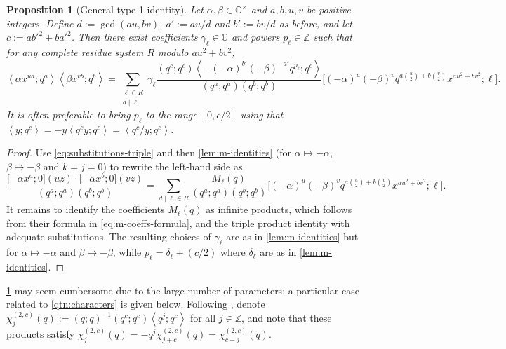 \documentclass[reqno,11pt]{amsart}
\newtheorem{proposition}[theorem]{Proposition}
\theoremstyle{definition}
\theoremstyle{remark}
\numberwithin{equation}{section}
\newcommand{\Z}{\mathbb{Z}}
\newcommand{\C}{\mathbb{C}}
\newcommand{\la}{\left\langle}
\newcommand{\ra}{\right\rangle}
\newcommand{\vect}[2]{\big[{#1};{#2}\big]}
\begin{document}
\begin{proposition}[General type-1 identity] \label{prop:general-type-1}
Let $\alpha, \beta \in \C^\times$ and $a, b, u, v$ be positive integers. Define $d := \gcd(au, bv)$, $a' := au/d$ and $b' := bv/d$ as before, and let $c := ab'^2 + ba'^2$. Then there exist coefficients $\gamma_\ell \in \C$ and powers $p_\ell \in \Z$ such that for any complete residue system $R$ modulo $au^2 + bv^2$,
\[
    \la \alpha x^{u a}; q^a \ra \la \beta x^{v b}; q^b \ra
    =
    \sum_{\substack{\ell \in R \\ d \mid \ell}} 
    \gamma_\ell \frac{(q^c; q^c)\la -(-\alpha)^{b'}(-\beta)^{-a'}q^{p_\ell} ; q^c \ra}{\left(q^a; q^a\right)\left(q^b; q^b\right)}
    \vect{(-\alpha)^u (-\beta)^v q^{a\binom{u}{2} + b \binom{v}{2}} x^{au^2+bv^2}}{\ell}.
\]
It is often preferable to bring $p_\ell$ to the range $[0, c/2]$ using that $\la y; q^c \ra = -y\la q^c y; q^c \ra = \la q^c/y; q^c \ra$.
\end{proposition}
\begin{proof}
Use \cref{eq:substitutions-triple} and then \cref{lem:m-identities} (for $\alpha \mapsto -\alpha$, $\beta \mapsto -\beta$ and $k = j = 0$) to rewrite the left-hand side as
\[
    \frac{\vect{-\alpha x^a}{0}(uz) \cdot \vect{-\alpha x^b}{0}(vz)}{\left(q^a; q^a\right)\left(q^b; q^b\right)}
    =
    \sum_{d \mid \ell \in R} 
    \frac{M_\ell(q)}{\left(q^a; q^a\right)\left(q^b; q^b\right)}
    \vect{(-\alpha)^u (-\beta)^v q^{a\binom{u}{2} + b \binom{v}{2}} x^{au^2+bv^2}}{\ell}.
\]
It remains to identify the coefficients $M_\ell(q)$ as infinite products, which follows from their formula in \cref{eq:m-coeffs-formula}, and the triple product identity with adequate substitutions. The resulting choices of $\gamma_\ell$ are as in \cref{lem:m-identities} but for $\alpha \mapsto -\alpha$ and $\beta \mapsto -\beta$, while $p_\ell = \delta_\ell + (c/2)$ where $\delta_\ell$ are as in \cref{lem:m-identities}.
\end{proof}

\cref{prop:general-type-1} may seem cumbersome due to the large number of parameters; a particular case related to \cref{qtn:characters} is given below. Following \cite[(5.2)]{andrews1999a2}, denote $\chi_j^{(2,c)}(q) := (q; q)^{-1}\left(q^c; q^c\right) \la q^j; q^c \ra$ for all $j \in \Z$, and note that these products satisfy $\chi_{j}^{(2,c)}(q) = -q^j \chi_{j+c}^{(2,c)}(q) = \chi_{c-j}^{(2,c)}(q)$.
\end{document}
